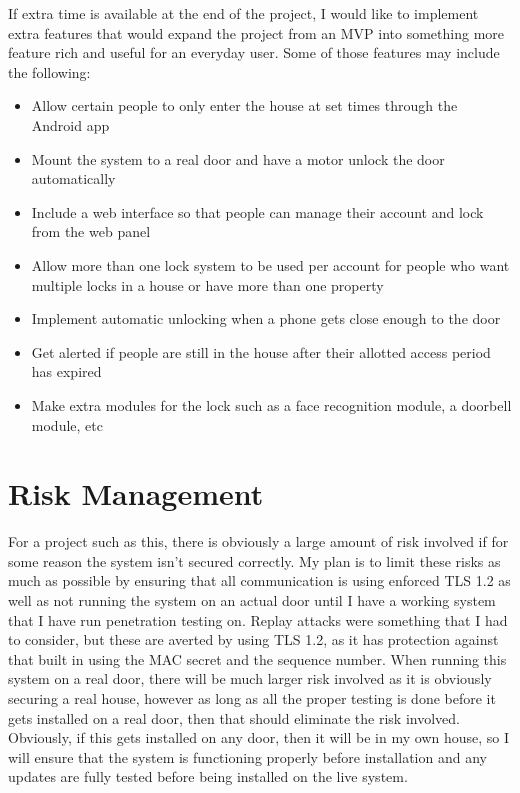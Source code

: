If extra time is available at the end of the project, I would like to implement extra features that would expand the project from an MVP into something more feature rich and useful for an everyday user. Some of those features may include the following:

\begin{itemize}
	\item Allow certain people to only enter the house at set times through the Android app
	\item Mount the system to a real door and have a motor unlock the door automatically
	\item Include a web interface so that people can manage their account and lock from the web panel
	\item Allow more than one lock system to be used per account for people who want multiple locks in a house or have more than one property
	\item Implement automatic unlocking when a phone gets close enough to the door
	\item Get alerted if people are still in the house after their allotted access period has expired
	\item Make extra modules for the lock such as a face recognition module, a doorbell module, etc
\end{itemize}


\section{Risk Management}
For a project such as this, there is obviously a large amount of risk involved if for some reason the system isn't secured correctly. My plan is to limit these risks as much as possible by ensuring that all communication is using enforced TLS 1.2 as well as not running the system on an actual door until I have a working system that I have run penetration testing on. Replay attacks were something that I had to consider, but these are averted by using TLS 1.2, as it has protection against that built in using the MAC secret and the sequence number. When running this system on a real door, there will be much larger risk involved as it is obviously securing a real house, however as long as all the proper testing is done before it gets installed on a real door, then that should eliminate the risk involved. Obviously, if this gets installed on any door, then it will be in my own house, so I will ensure that the system is functioning properly before installation and any updates are fully tested before being installed on the live system.

